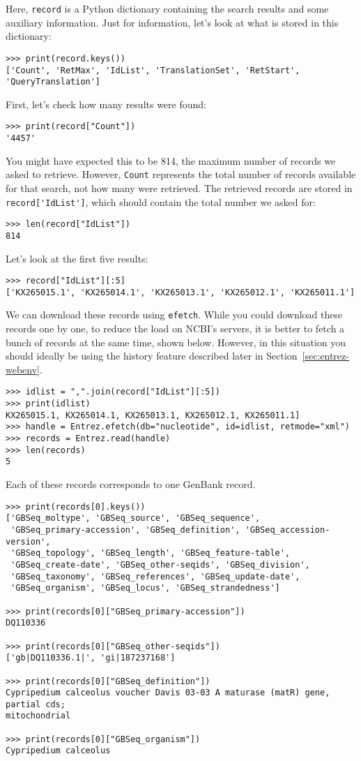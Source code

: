 Here, \verb+record+ is a Python dictionary containing the search results and some auxiliary information. Just for information, let's look at what is stored in this dictionary:
\begin{verbatim}
>>> print(record.keys())
['Count', 'RetMax', 'IdList', 'TranslationSet', 'RetStart', 'QueryTranslation']
\end{verbatim}
First, let's check how many results were found:
\begin{verbatim}
>>> print(record["Count"])
'4457'
\end{verbatim}
You might have expected this to be 814, the maximum number of records we asked to retrieve. 
However, \verb+Count+ represents the total number of records available for that search, not how many were retrieved.
The retrieved records are stored in \verb+record['IdList']+, which should contain the total number we asked for:
\begin{verbatim}
>>> len(record["IdList"])
814
\end{verbatim}
Let's look at the first five results:
\begin{verbatim}
>>> record["IdList"][:5]
['KX265015.1', 'KX265014.1', 'KX265013.1', 'KX265012.1', 'KX265011.1']
\end{verbatim}

\label{sec:entrez-batched-efetch}
We can download these records using \verb+efetch+.
While you could download these records one by one, to reduce the load on NCBI's servers, it is better to fetch a bunch of records at the same time, shown below.
However, in this situation you should ideally be using the history feature described later in Section~\ref{sec:entrez-webenv}.

\begin{verbatim}
>>> idlist = ",".join(record["IdList"][:5])
>>> print(idlist)
KX265015.1, KX265014.1, KX265013.1, KX265012.1, KX265011.1]
>>> handle = Entrez.efetch(db="nucleotide", id=idlist, retmode="xml")
>>> records = Entrez.read(handle)
>>> len(records)
5
\end{verbatim}
Each of these records corresponds to one GenBank record.
\begin{verbatim}
>>> print(records[0].keys())
['GBSeq_moltype', 'GBSeq_source', 'GBSeq_sequence',
 'GBSeq_primary-accession', 'GBSeq_definition', 'GBSeq_accession-version',
 'GBSeq_topology', 'GBSeq_length', 'GBSeq_feature-table',
 'GBSeq_create-date', 'GBSeq_other-seqids', 'GBSeq_division',
 'GBSeq_taxonomy', 'GBSeq_references', 'GBSeq_update-date',
 'GBSeq_organism', 'GBSeq_locus', 'GBSeq_strandedness']

>>> print(records[0]["GBSeq_primary-accession"])
DQ110336

>>> print(records[0]["GBSeq_other-seqids"])
['gb|DQ110336.1|', 'gi|187237168']

>>> print(records[0]["GBSeq_definition"])
Cypripedium calceolus voucher Davis 03-03 A maturase (matR) gene, partial cds;
mitochondrial

>>> print(records[0]["GBSeq_organism"])
Cypripedium calceolus
\end{verbatim}

